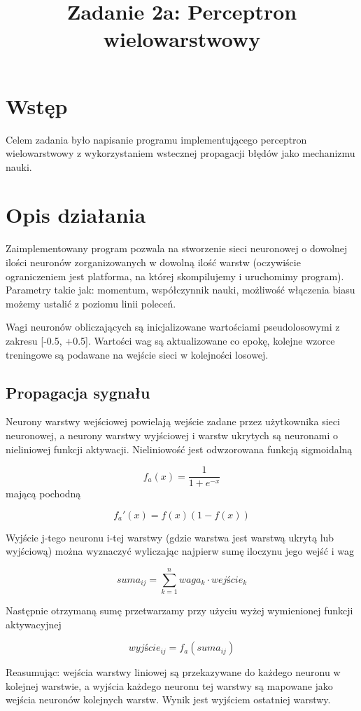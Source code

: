 \documentclass{classrep}
\author{
  \studentinfo{Marcin Pajkowski}{211968} \and
  \studentinfo{Rafał Warda}{214067}
}
\title{Zadanie 2a: Perceptron wielowarstwowy}
\begin{document}
\maketitle

\section{Wstęp}
Celem zadania było napisanie programu implementującego perceptron wielowarstwowy z wykorzystaniem wstecznej propagacji błędów jako mechanizmu nauki.

\section{Opis działania}
Zaimplementowany program pozwala na stworzenie sieci neuronowej o dowolnej ilości neuronów zorganizowanych w dowolną ilość warstw (oczywiście ograniczeniem jest platforma, na której skompilujemy i uruchomimy program). Parametry takie jak: momentum, współczynnik nauki, możliwość włączenia biasu możemy ustalić z poziomu linii poleceń.

Wagi neuronów obliczających są inicjalizowane wartościami pseudolosowymi z zakresu [-0.5, +0.5]. Wartości wag są aktualizowane co epokę, kolejne wzorce treningowe są podawane na wejście sieci w kolejności losowej.
\clearpage
\subsection{Propagacja sygnału}
Neurony warstwy wejściowej powielają wejście zadane przez użytkownika sieci neuronowej, a neurony warstwy wyjściowej i warstw ukrytych są neuronami o nieliniowej funkcji aktywacji. Nieliniowość jest odwzorowana funkcją sigmoidalną


$$ f_a(x) =  \frac{1}{{1} + e^{-x} } $$
mającą pochodną

$$ f_a'(x) = f(x)(1-f(x)) $$

Wyjście j-tego neuronu i-tej warstwy (gdzie warstwa jest warstwą ukrytą lub wyjściową) można wyznaczyć wyliczając najpierw sumę iloczynu jego wejść i wag

$$ suma_{ij} = \sum_{k=1}^{n} waga_k \cdot wejście_k $$

Następnie otrzymaną sumę przetwarzamy przy użyciu wyżej wymienionej funkcji aktywacyjnej

$$ wyjście_{ij} = f_a(suma_{ij}) $$

Reasumując: wejścia warstwy liniowej są przekazywane do każdego neuronu w kolejnej warstwie, a wyjścia każdego neuronu tej warstwy są mapowane jako wejścia neuronów kolejnych warstw. Wynik jest wyjściem ostatniej warstwy.
\end{document}
